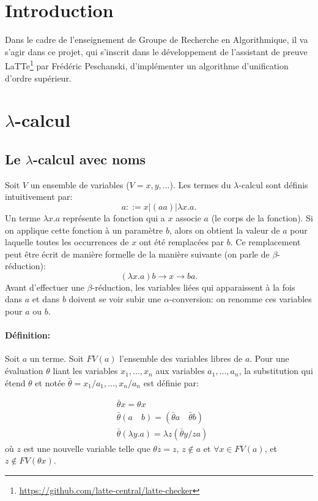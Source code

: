 \section{Introduction}

Dans le cadre de l'enseignement de Groupe de Recherche en Algorithmique, il va s'agir dans ce projet, qui s'inscrit dans le développement de l'assistant de preuve LaTTe\footnote{\url{https://github.com/latte-central/latte-checker}} par Frédéric Peschanski, d'implémenter un algorithme d'unification d'ordre supérieur.

\section{$\lambda$-calcul}

\subsection{Le $\lambda$-calcul avec noms}

Soit $V$ un ensemble de variables ($V={x,y,\dots}$). Les termes du $\lambda$-calcul sont définis intuitivement par:
\[ a ::= x | (a a) | \lambda x. a.\]
Un terme $\lambda x.a$ représente la fonction qui a $x$ associe $a$ (le corps de la fonction). Si on applique cette fonction à un paramètre $b$, alors on obtient la valeur de $a$ pour laquelle toutes les occurrences de $x$ ont été remplacées par $b$. Ce remplacement peut être écrit de manière formelle de la manière suivante (on parle de $\beta$-réduction):
\[ (\lambda x .a) b \xrightarrow{}{x \xrightarrow{} b} a. \]
Avant d’effectuer une $\beta$-réduction, les variables liées qui apparaissent à la fois dans $a$ et dans $b$ doivent se voir subir une $\alpha$-conversion: on renomme ces variables pour $a$ ou $b$.

\paragraph{Définition:}
Soit $a$ un terme. Soit $FV(a)$ l’ensemble des variables libres de $a$. Pour une évaluation $\theta$ liant les variables $x_1,\dots,x_n$ aux variables $a_1,\dots,a_n$, la substitution qui étend $\theta$ et notée $\bar{\theta}={x_1/a_1,\dots,x_n/a_n}$ est définie par:

\begin{align*}
&\bar{\theta}x = \theta x \\
&\bar{\theta}(a \quad b) = (\bar{\theta}a \quad \bar{\theta}b) \\
& \bar{\theta}(\lambda y.a) = \lambda z (\bar{\theta}{y/z}a) 
\end{align*}
où $z$ est une nouvelle variable telle que $\theta z = z$, $z \notin a$ et $\forall{x} \in FV(a)$, et $z \notin FV(\theta x)$.

